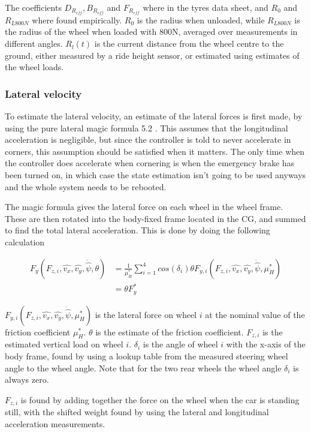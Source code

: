 The coefficients $D_{R_{eff}}, B_{R_{eff}}$ and $F_{R_{eff}}$ where in the tyres data sheet, and $R_0$ and $R_{L800N}$ where found empirically. $R_0$ is the radius when unloaded, while $R_{L800N}$ is the radius of the wheel when loaded with 800N, averaged over measurements in different angles. $R_l(t)$ is the current distance from the wheel centre to the ground, either measured by a ride height sensor, or estimated using estimates of the wheel loads.

\subsubsection{Lateral velocity} 
To estimate the lateral velocity, an estimate of the lateral forces is first made, by using the pure lateral magic formula 5.2 \cite{MagicFormula5_2}. This assumes that the longitudinal acceleration is negligible, but since the controller is told to never accelerate in corners, this assumption should be satisfied when it matters. The only time when the controller does accelerate when cornering is when the emergency brake has been turned on, in which case the state estimation isn't going to be used anyways and the whole system needs to be rebooted. 

The magic formula gives the lateral force on each wheel in the wheel frame. These are then rotated into the body-fixed frame located in the \gls{CG}, and summed to find the total lateral acceleration. This is done by doing the following calculation

\begin{align}
    F_y(F_{z,i},\hat{v_x},\hat{v_y},\dot{\hat{\psi}}, \theta) & = \frac{1}{\mu_{H}^{*}}\sum_{i=1}^{4}cos(\delta_i)\theta F_{y,i}(F_{z,i},\hat{v_x},\hat{v_y},\dot{\hat{\psi}}, \mu_{H}^{*}) \\
    & =  \theta F_y^{*}
\end{align}

$F_{y,i}(F_{z,i},\hat{v_x},\hat{v_y},\dot{\hat{\psi}}, \mu_{H}^{*})$ is the lateral force on wheel $i$ at the nominal value of the friction coefficient $\mu_{H}^{*}$. $\theta$ is the estimate of the friction coefficient. $F_{z,i}$ is the estimated vertical load on wheel $i$. $\delta_i$ is the angle of wheel $i$ with the x-axis of the body frame, found by using a lookup table from the measured steering wheel angle to the wheel angle. Note that for the two rear wheels the wheel angle $\delta_i$ is always zero. 

$F_{z,i}$ is found by adding together the force on the wheel when the car is standing still, with the shifted weight found by using the lateral and longitudinal acceleration measurements.  

